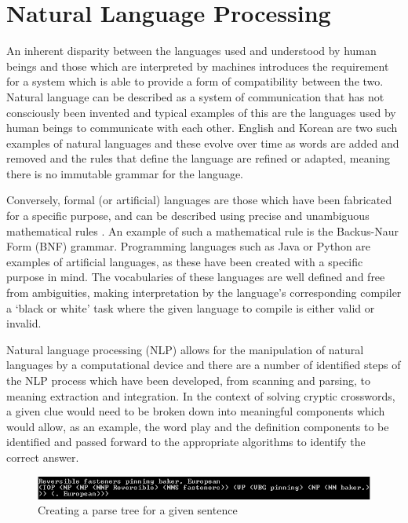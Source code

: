 \section{Natural Language Processing}

An inherent disparity between the languages used and understood by human beings
and those which are interpreted by machines introduces the requirement for a
system which is able to provide a form of compatibility between the two. Natural
language can be described as  a system of communication that has not consciously
been invented \citep{collins04} and typical examples of this are the languages
used by human beings to communicate with each other. English and Korean are two
such examples of natural languages and these evolve over time as words are added
and removed and the rules that define the language are refined or adapted,
meaning there is no immutable grammar for the language.

Conversely, formal (or artificial) languages are those which have been
fabricated for a specific purpose, and can be described using precise and
unambiguous mathematical rules \citep{jiang10}. An example of such a
mathematical rule is the Backus-Naur Form (BNF) grammar. Programming languages
such as Java or Python are examples of artificial languages, as these have been
created with a specific purpose in mind. The vocabularies of these languages are
well defined and free from ambiguities, making interpretation by the language’s
corresponding compiler a ‘black or white’ task where the given language to
compile is either valid or invalid.

Natural language processing (NLP) allows for the manipulation of natural
languages by a computational device \citep{bird09} and there are a number of
identified steps of the NLP process which have been developed, from scanning and
parsing, to meaning extraction and integration. In the context of solving
cryptic crosswords, a given clue would need to be broken down into meaningful
components which would allow, as an example, the word play and the definition
components to be identified and passed forward to the appropriate algorithms to
identify the correct answer.

\begin{figure}[H]
	\centering
	\includegraphics[width=\linewidth]{parse_tree.png}
	\caption{Creating a parse tree for a given sentence}
\end{figure}

